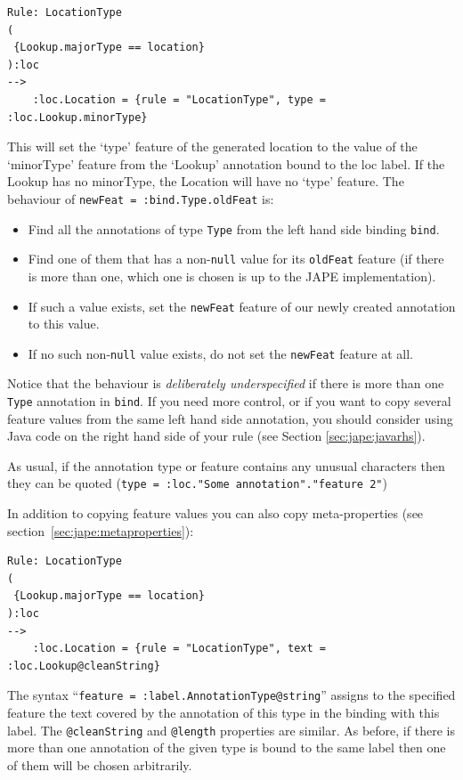 \begin{small}
\begin{verbatim}
Rule: LocationType
(
 {Lookup.majorType == location}
):loc
-->
    :loc.Location = {rule = "LocationType", type = :loc.Lookup.minorType}
\end{verbatim}
\end{small}

This will set the `type' feature of the generated location to the value of the
`minorType' feature from the `Lookup' annotation bound to the loc label.  If
the Lookup has no minorType, the Location will have no `type' feature.  The
behaviour of {\tt newFeat = :bind.Type.oldFeat} is:
\begin{itemize}
\item Find all the annotations of type {\tt Type} from the left hand side
binding {\tt bind}.
\item Find one of them that has a non-{\tt null} value for its {\tt oldFeat}
feature (if there is more than one, which one is chosen is up to the JAPE
implementation).
\item If such a value exists, set the {\tt newFeat} feature of our newly
created annotation to this value.
\item If no such non-{\tt null} value exists, do not set the {\tt newFeat}
feature at all.
\end{itemize}
%
Notice that the behaviour is {\it deliberately underspecified} if there is more
than one {\tt Type} annotation in {\tt bind}.  If you need more control, or if
you want to copy several feature values from the same left hand side
annotation, you should consider using Java code on the right hand side of your
rule (see Section \ref{sec:jape:javarhs}).

As usual, if the annotation type or feature contains any unusual characters
then they can be quoted (\verb!type = :loc."Some annotation"."feature 2"!)

In addition to copying feature values you can also copy meta-properties (see
section~\ref{sec:jape:metaproperties}):
%
\begin{small}
\begin{verbatim}
Rule: LocationType
(
 {Lookup.majorType == location}
):loc
-->
    :loc.Location = {rule = "LocationType", text = :loc.Lookup@cleanString}
\end{verbatim}
\end{small}

The syntax ``\verb|feature = :label.AnnotationType@string|'' assigns to the
specified feature the text covered by the annotation of this type in the
binding with this label.  The \verb|@cleanString| and \verb|@length| properties
are similar.  As before, if there is more than one annotation of the given type
is bound to the same label then one of them will be chosen arbitrarily.

